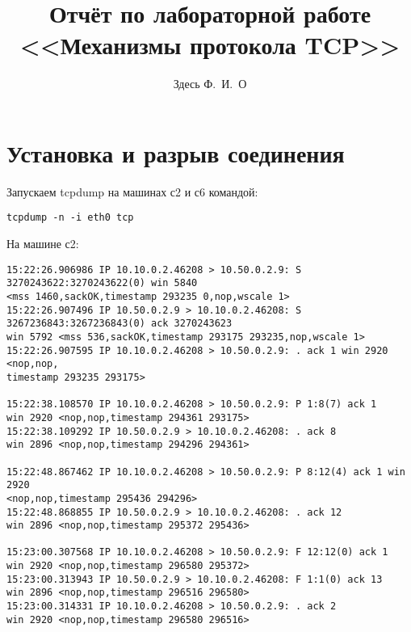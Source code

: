 \documentclass[a4paper,12pt]{article}
\title{Отчёт по лабораторной работе \\ <<Механизмы протокола TCP>>}
\author{Здесь Ф.~И.~О}
\begin{document}
\maketitle

\tableofcontents


\section{Установка и разрыв соединения}

Запускаем tcpdump на машинах с2 и с6 командой:

\begin{Verbatim}
tcpdump -n -i eth0 tcp
\end{Verbatim}

На машине с2:
\begin{Verbatim}
15:22:26.906986 IP 10.10.0.2.46208 > 10.50.0.2.9: S 3270243622:3270243622(0) win 5840 
<mss 1460,sackOK,timestamp 293235 0,nop,wscale 1>
15:22:26.907496 IP 10.50.0.2.9 > 10.10.0.2.46208: S 3267236843:3267236843(0) ack 3270243623 
win 5792 <mss 536,sackOK,timestamp 293175 293235,nop,wscale 1>
15:22:26.907595 IP 10.10.0.2.46208 > 10.50.0.2.9: . ack 1 win 2920 <nop,nop,
timestamp 293235 293175>

15:22:38.108570 IP 10.10.0.2.46208 > 10.50.0.2.9: P 1:8(7) ack 1 
win 2920 <nop,nop,timestamp 294361 293175>
15:22:38.109292 IP 10.50.0.2.9 > 10.10.0.2.46208: . ack 8 
win 2896 <nop,nop,timestamp 294296 294361>

15:22:48.867462 IP 10.10.0.2.46208 > 10.50.0.2.9: P 8:12(4) ack 1 win 2920 
<nop,nop,timestamp 295436 294296>
15:22:48.868855 IP 10.50.0.2.9 > 10.10.0.2.46208: . ack 12 
win 2896 <nop,nop,timestamp 295372 295436>

15:23:00.307568 IP 10.10.0.2.46208 > 10.50.0.2.9: F 12:12(0) ack 1 
win 2920 <nop,nop,timestamp 296580 295372>
15:23:00.313943 IP 10.50.0.2.9 > 10.10.0.2.46208: F 1:1(0) ack 13 
win 2896 <nop,nop,timestamp 296516 296580>
15:23:00.314331 IP 10.10.0.2.46208 > 10.50.0.2.9: . ack 2 
win 2920 <nop,nop,timestamp 296580 296516>
\end{Verbatim}
\end{document}
